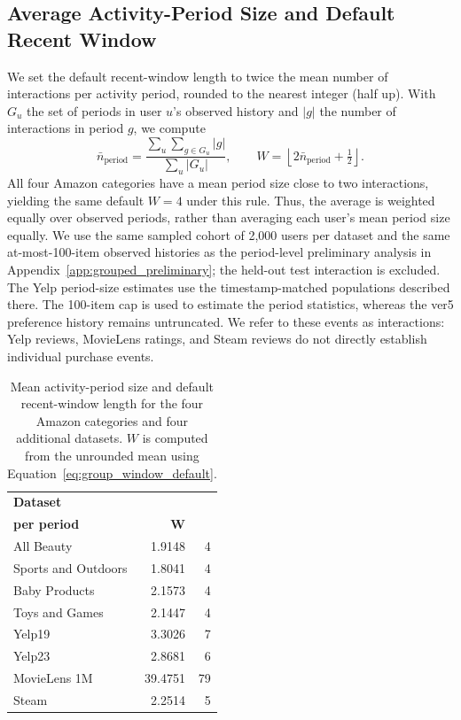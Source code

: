 ﻿\documentclass[sigconf,anonymous,review]{acmart}
\begin{document}
\subsection{Average Activity-Period Size and Default Recent Window}
\label{app:group_window_default}
We set the default recent-window length to twice the mean number of interactions per activity period, rounded to the nearest integer (half up). With $G_u$ the set of periods in user $u$'s observed history and $|g|$ the number of interactions in period $g$, we compute
\begin{equation}
    \bar{n}_{\mathrm{period}} = \frac{\sum_u\sum_{g\in G_u}|g|}{\sum_u|G_u|},
    \qquad W = \left\lfloor 2\bar{n}_{\mathrm{period}} + \tfrac{1}{2}\right\rfloor.
    \label{eq:group_window_default}
\end{equation}
All four Amazon categories have a mean period size close to two interactions, yielding the same default $W=4$ under this rule. Thus, the average is weighted equally over observed periods, rather than averaging each user's mean period size equally. We use the same sampled cohort of 2,000 users per dataset and the same at-most-100-item observed histories as the period-level preliminary analysis in Appendix~\ref{app:grouped_preliminary}; the held-out test interaction is excluded. The Yelp period-size estimates use the timestamp-matched populations described there. The 100-item cap is used to estimate the period statistics, whereas the ver5 preference history remains untruncated. We refer to these events as interactions: Yelp reviews, MovieLens ratings, and Steam reviews do not directly establish individual purchase events.

\begin{table}[!tbp]
    \centering
    \small
    \setlength{\tabcolsep}{5pt}
    \renewcommand{\arraystretch}{1.12}
    \begin{tabular}{lrr}
        \toprule
        \textbf{Dataset} & \shortstack{\textbf{Mean interactions}\\\textbf{per period}} & $\boldsymbol{W}$ \\
        \midrule
        All Beauty & 1.9148 & 4 \\
        Sports and Outdoors & 1.8041 & 4 \\
        Baby Products & 2.1573 & 4 \\
        Toys and Games & 2.1447 & 4 \\
        \midrule
        Yelp19 & 3.3026 & 7 \\
        Yelp23 & 2.8681 & 6 \\
        MovieLens 1M & 39.4751 & 79 \\
        Steam & 2.2514 & 5 \\
        \bottomrule
    \end{tabular}
    \caption{Mean activity-period size and default recent-window length for the four Amazon categories and four additional datasets. $W$ is computed from the unrounded mean using Equation~\ref{eq:group_window_default}.}
    \label{tab:additional_group_means}
\end{table}
\end{document}
